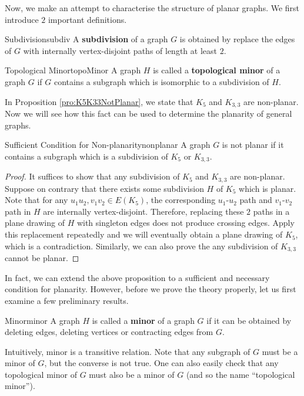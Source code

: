 \documentclass[math]{amznotes}
\theoremstyle{remark}
\newcommand{\0}{\mathbf{0}}
\newcommand{\1}{\mathbf{1}}
\begin{document}
Now, we make an attempt to characterise the structure of planar graphs. We first introduce $2$ important definitions.
\begin{dfnbox}{Subdivision}{subdiv}
    A {\color{red} \textbf{subdivision}} of a graph $G$ is obtained by replace the edges of $G$ with internally vertex-disjoint paths of length at least $2$.
\end{dfnbox}
\begin{dfnbox}{Topological Minor}{topoMinor}
    A graph $H$ is called a {\color{red} \textbf{topological minor}} of a graph $G$ if $G$ contains a subgraph which is isomorphic to a subdivision of $H$.
\end{dfnbox}
In Proposition \ref{pro:K5K33NotPlanar}, we state that $K_5$ and $K_{3, 3}$ are non-planar. Now we will see how this fact can be used to determine the planarity of general graphs.
\begin{probox}{Sufficient Condition for Non-planarity}{nonplanar}
    A graph $G$ is not planar if it contains a subgraph which is a subdivision of $K_5$ or $K_{3, 3}$.
    \tcblower
    \begin{proof}
        It suffices to show that any subdivision of $K_5$ and $K_{3, 3}$ are non-planar. Suppose on contrary that there exists some subdivision $H$ of $K_5$ which is planar. Note that for any $u_1u_2, v_1v_2 \in E(K_5)$, the corresponding $u_1$-$u_2$ path and $v_1$-$v_2$ path in $H$ are internally vertex-disjoint. Therefore, replacing these $2$ paths in a plane drawing of $H$ with singleton edges does not produce crossing edges. Apply this replacement repeatedly and we will eventually obtain a plane drawing of $K_5$, which is a contradiction. Similarly, we can also prove the any subdivision of $K_{3, 3}$ cannot be planar.
    \end{proof}
\end{probox}
In fact, we can extend the above proposition to a sufficient and necessary condition for planarity. However, before we prove the theory properly, let us first examine a few preliminary results.
\begin{dfnbox}{Minor}{minor}
    A graph $H$ is called a {\color{red} \textbf{minor}} of a graph $G$ if it can be obtained by deleting edges, deleting vertices or contracting edges from $G$.
\end{dfnbox}
Intuitively, minor is a transitive relation. Note that any subgraph of $G$ must be a minor of $G$, but the converse is not true. One can also easily check that any topological minor of $G$ must also be a minor of $G$ (and so the name ``topological minor''). 
\end{document}
